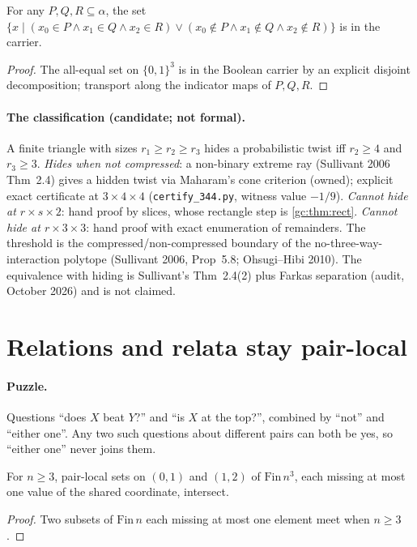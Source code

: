 \begin{theorem}
\label{gc:thm:rect}
\leanok
{}
For any $P,Q,R\subseteq\alpha$, the set
$\{x\mid (x_0\in P\wedge x_1\in Q\wedge x_2\in R)\vee(x_0\notin P\wedge x_1\notin Q\wedge x_2\notin R)\}$
is in the carrier.
\end{theorem}
\begin{proof}
\leanok
The all-equal set on $\{0,1\}^3$ is in the Boolean carrier by an explicit
disjoint decomposition; transport along the indicator maps of $P,Q,R$.
\end{proof}

\paragraph{The classification (candidate; not formal).} A finite triangle with
sizes $r_1\ge r_2\ge r_3$ hides a probabilistic twist iff $r_2\ge4$ and
$r_3\ge3$. \emph{Hides when not compressed}: a non-binary extreme ray
(Sullivant 2006 Thm~2.4) gives a hidden twist via Maharam's cone criterion
(owned); explicit exact certificate at $3\times4\times4$ (\texttt{certify\_344.py},
witness value $-1/9$). \emph{Cannot hide at $r\times s\times2$}: hand proof by
slices, whose rectangle step is \ref{gc:thm:rect}. \emph{Cannot hide at
$r\times3\times3$}: hand proof with exact enumeration of remainders. The
threshold is the compressed/non-compressed boundary of the no-three-way-
interaction polytope (Sullivant 2006, Prop~5.8; Ohsugi--Hibi 2010). The
equivalence with hiding is Sullivant's Thm~2.4(2) plus Farkas separation (audit,
October 2026) and is not claimed.

\section{Relations and relata stay pair-local}

\paragraph{Puzzle.} Questions ``does $X$ beat $Y$?'' and ``is $X$ at the top?'',
combined by ``not'' and ``either one''. Any two such questions about different
pairs can both be yes, so ``either one'' never joins them.

\begin{lemma}
\label{gc:lem:meet}
\leanok
For $n\ge3$, pair-local sets on $(0,1)$ and $(1,2)$ of $\mathrm{Fin}\,n^3$, each
missing at most one value of the shared coordinate, intersect.
\end{lemma}
\begin{proof}
\leanok
Two subsets of $\mathrm{Fin}\,n$ each missing at most one element meet when
$n\ge3$.
\end{proof}

